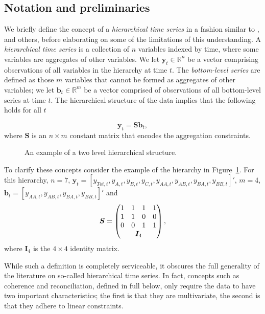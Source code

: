 \documentclass[12pt]{article}
\theoremstyle{definition}
\theoremstyle{property}
\begin{document}
	\subsection{Notation and preliminaries}\label{sec:notation}
	
    We briefly define the concept of a \emph{hierarchical time series} in a fashion similar to \cite{WicEtAl2019}, \cite{FPP2018} and others, before elaborating on some of the limitations of this understanding.  A \emph{hierarchical time series} is a collection of $n$ variables indexed by time, where some variables are aggregates of other variables. We let $\bm{y}_t \in \mathbb{R}^n$ be a vector comprising observations of all variables in the hierarchy at time $t$. The \emph{bottom-level series} are defined as those $m$ variables that cannot be formed as aggregates of other variables; we let $\bm{b}_t \in \mathbb{R}^m$ be a vector comprised of observations of all bottom-level series at time $t$.  The hierarchical structure of the data implies that the following holds for all $t$
    
    \begin{equation}
    \bm{y}_t = \bm{Sb}_t,
    \end{equation}
    where $\bm{S}$ is an $n \times m$ constant matrix that encodes the aggregation constraints.  
	
		\begin{figure}[H]
			\begin{center}
				 
				 
				\qobitree
			\end{center}
			\caption{An example of a two level hierarchical structure.}\label{fig:basichier}
		\end{figure}
	
	To clarify these concepts consider the example of the hierarchy in Figure~\ref{fig:basichier}.  For this hierarchy, $n=7$, $\bm{y}_t = [y_{Tot,t},y_{A,t}, y_{B,t},y_{C,t},y_{AA,t}, y_{AB,t}, y_{BA,t}, y_{BB,t}]'$, $m=4$, $\bm{b}_t = [y_{AA,t}, y_{AB,t}, y_{BA,t}, y_{BB,t}]'$ and
	\[
	\bm{S} = \begin{pmatrix}
	1 & 1 & 1 & 1  \\
	1 & 1 & 0 & 0 \\
	0 & 0 & 1 & 1 \\
	& \multicolumn{2}{c}{\bm{I}_4} &
	\end{pmatrix},
	\]
	where $\bm{I}_4$ is the $4\times 4$ identity matrix.
	
	While such a definition is completely serviceable, it obscures the full generality of the literature on so-called hierarchical time series.  In fact, concepts such as coherence and reconciliation, defined in full below, only require the data to have two important characteristics; the first is that they are multivariate, the second is that they adhere to linear constraints.  
	
\end{document}
